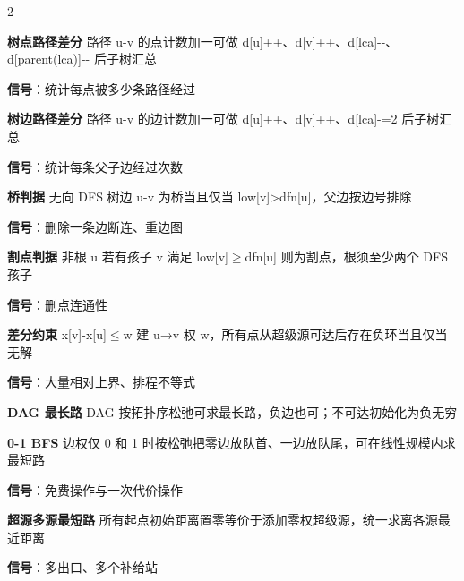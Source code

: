 \documentclass[UTF8,fontset=fandol,a4paper,twoside]{ctexart}
\begin{document}
\begin{multicols}{2}
\par\textbf{树点路径差分}\quad
路径 u-\allowbreak{}v 的点计数加一可做 d[\allowbreak{}u]\allowbreak{}+\allowbreak{}+\allowbreak{}、d[\allowbreak{}v]\allowbreak{}+\allowbreak{}+\allowbreak{}、d[\allowbreak{}lca]\allowbreak{}-\allowbreak{}-\allowbreak{}、d[\allowbreak{}parent(\allowbreak{}lca)\allowbreak{}]\allowbreak{}-\allowbreak{}-\allowbreak{} 后子树汇总\par
\textbf{信号}：统计每点被多少条路径经过\par
\par\textbf{树边路径差分}\quad
路径 u-\allowbreak{}v 的边计数加一可做 d[\allowbreak{}u]\allowbreak{}+\allowbreak{}+\allowbreak{}、d[\allowbreak{}v]\allowbreak{}+\allowbreak{}+\allowbreak{}、d[\allowbreak{}lca]\allowbreak{}-\allowbreak{}=\allowbreak{}2 后子树汇总\par
\textbf{信号}：统计每条父子边经过次数\par
\par\textbf{桥判据}\quad
无向 DFS 树边 u-\allowbreak{}v 为桥当且仅当 low[\allowbreak{}v]\allowbreak{}>\allowbreak{}dfn[\allowbreak{}u]\allowbreak{}，父边按边号排除\par
\textbf{信号}：删除一条边断连、重边图\par
\par\textbf{割点判据}\quad
非根 u 若有孩子 v 满足 low[\allowbreak{}v]\allowbreak{}\ensuremath{\ge}dfn[\allowbreak{}u]\allowbreak{} 则为割点，根须至少两个 DFS 孩子\par
\textbf{信号}：删点连通性\par
\par\textbf{差分约束}\quad
x[\allowbreak{}v]\allowbreak{}-\allowbreak{}x[\allowbreak{}u]\allowbreak{}\ensuremath{\le}w 建 u→v 权 w，所有点从超级源可达后存在负环当且仅当无解\par
\textbf{信号}：大量相对上界、排程不等式\par
\par\textbf{DAG 最长路}\quad
DAG 按拓扑序松弛可求最长路，负边也可；不可达初始化为负无穷\par
\par\textbf{0-1 BFS}\quad
边权仅 0 和 1 时按松弛把零边放队首、一边放队尾，可在线性规模内求最短路\par
\textbf{信号}：免费操作与一次代价操作\par
\par\textbf{超源多源最短路}\quad
所有起点初始距离置零等价于添加零权超级源，统一求离各源最近距离\par
\textbf{信号}：多出口、多个补给站\par

\end{multicols}
\end{document}
